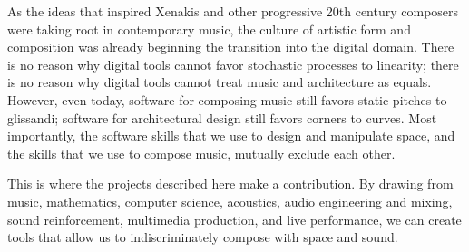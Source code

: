 As the ideas that inspired Xenakis and other progressive 20th century
composers were taking root in contemporary music, the culture of
artistic form and composition was already beginning the transition
into the digital domain. There is no reason why digital tools cannot
favor stochastic processes to linearity; there is no reason why
digital tools cannot treat music and architecture as equals. However,
even today, software for composing music still favors static pitches
to glissandi; software for architectural design still favors corners
to curves. Most importantly, the software skills that we use to design
and manipulate space, and the skills that we use to compose music,
mutually exclude each other.

This is where the projects described here make a contribution.  By
drawing from music, mathematics, computer science, acoustics, audio
engineering and mixing, sound reinforcement, multimedia production,
and live performance, we can create tools that allow us to
indiscriminately compose with space and sound.

